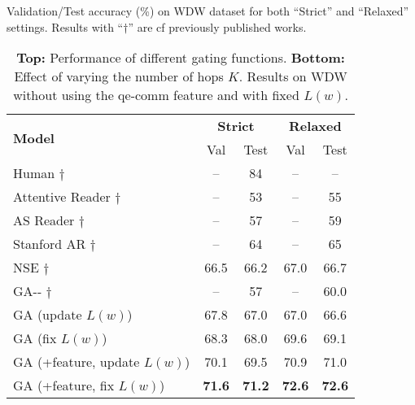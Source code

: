 \documentclass[11pt,a4paper]{article}
\begin{document}
\begin{table*}[ht]
\parbox{.60\linewidth}{
\centering
\caption{\small Validation/Test accuracy (\%) on WDW dataset for both ``Strict'' and ``Relaxed'' settings. Results with ``$\dagger$'' are cf previously published works.}
\label{tab:wdw}
\begin{tabular}{l|cc|cc}
\toprule
\multirow{2}{*}{\textbf{Model}}  & \multicolumn{2}{c|}{\textbf{Strict}}              & \multicolumn{2}{c}{\textbf{Relaxed}}              \\ \cmidrule(l){2-5} 
                        & \multicolumn{1}{c|}{Val} & Test          & \multicolumn{1}{c|}{Val} & Test          \\ \midrule
Human  $\dagger$                 & --                       & 84          & --                       & --            \\ \midrule
Attentive Reader   $\dagger$     & --                       & 53          & --                       & 55         \\
AS Reader   $\dagger$            & --                       & 57          & --                       & 59          \\
Stanford AR    $\dagger$         & --                       & 64          & --                       & 65          \\
NSE $\dagger$& 66.5                     & 66.2          & 67.0                     & 66.7          \\ \midrule
GA-{}-  $\dagger$             & --                     & 57          & --                     & 60.0          \\
GA (update $L(w)$)              & 67.8                     & 67.0          & 67.0                     & 66.6          \\
GA (fix $L(w)$)              & 68.3                     & 68.0          & 69.6                     & 69.1          \\
GA (+feature, update $L(w)$)    & 70.1            & 69.5 & 70.9            & 71.0 \\
GA (+feature, fix $L(w)$)    & \textbf{71.6}            & \textbf{71.2} & \textbf{72.6}            & \textbf{72.6} \\\bottomrule
\end{tabular}
}
\hfill
\parbox{.375\linewidth}{
\centering
\caption{\small \textbf{Top:} Performance of different gating functions. \textbf{Bottom:} Effect of varying the number of hops $K$. Results on WDW without using the qe-comm feature and with fixed $L(w)$.}
\label{tab:gating_fn}
}
\end{table*}
\end{document}
